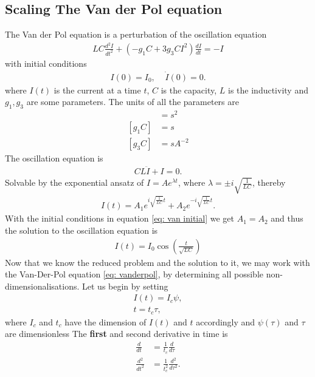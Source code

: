 \documentclass[a4paper]{article}
\begin{document}
\subsection{Scaling The Van der Pol equation}
The Van der Pol equation is a perturbation of the oscillation equation
\begin{align}\label{eq: vanderpol}
    LC\frac{d^2I}{dt^2} + (-g_1C +3g_3CI^2)\frac{dI}{dt} = -I
\end{align}
with initial conditions
\begin{align}\label{eq: van initial}
    I(0) = I_0,\;\;\;\; \dot{I}(0) = 0.
\end{align}
where $I(t)$ is the current at a time $t$, $C$ is the capacity, $L$ is the
inductivity and $g_1, g_3$ are some parameters. The units of all the
parameters are
\begin{align}
    [LC] &= s^2\\
    [g_1C] &= s\\
    [g_3C] &= sA^{-2}
\end{align}
The oscillation equation is
\begin{align}
    CL\ddot{I} + I = 0.
\end{align}
Solvable by the exponential ansatz of $I = Ae^{\lambda t}$, where $\lambda=
\pm i \sqrt{\frac{1}{LC}}$, thereby
\begin{align}
    I(t) = A_1 e^{i\sqrt{\frac{1}{LC}}t} + A_2 e^{-i\sqrt{\frac{1}{LC}}t}.
\end{align}
With the initial conditions in equation \ref{eq: van initial} we get $A_1 =
A_2$ and thus the solution to the oscillation equation is
\begin{align}
    I(t) = I_0\cos(\frac{t}{\sqrt{LC}})
\end{align}
Now that we know the reduced problem and the solution to it, we may work with
the Van-Der-Pol equation \ref{eq: vanderpol}, by determining all possible
non-dimensionalisations. Let us begin by setting
\begin{align}
    I(t) = I_c\psi,\\
    t = t_c \tau,
\end{align}
where $I_c$ and $t_c$ have the dimension of $I(t)$ and $t$ accordingly and
$\psi(\tau)$ and $\tau$ are dimensionless
The \textbf{first} and second derivative in time is
\begin{align}
    \frac{d}{dt} &= \frac{1}{t_c}\frac{d}{d\tau}\\
    \frac{d^2}{dt^2} &= \frac{1}{t_c^2}\frac{d^2}{d\tau^2}.
\end{align}
\end{document}
